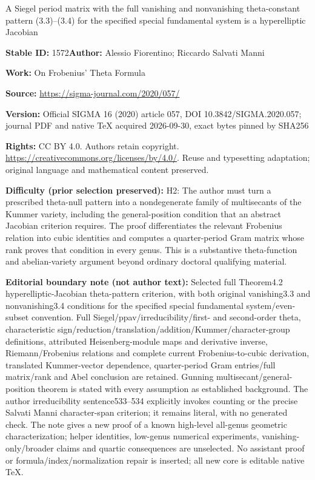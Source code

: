 \documentclass[11pt]{article}
\numberwithin{equation}{section}
\numberwithin{equation}{section}
\begin{document}
\begin{center}\Large A Siegel period matrix with the full vanishing and nonvanishing theta-constant pattern (3.3)–(3.4) for the specified special fundamental system is a hyperelliptic Jacobian\end{center}
\noindent\textbf{Stable ID:} 1572\quad\textbf{Author:} Alessio Fiorentino; Riccardo Salvati Manni\par
\noindent\textbf{Work:} On Frobenius' Theta Formula\par
\noindent\textbf{Source:} \url{https://sigma-journal.com/2020/057/}\par
\noindent\textbf{Version:} Official SIGMA 16 (2020) article 057, DOI 10.3842/SIGMA.2020.057; journal PDF and native TeX acquired 2026-09-30, exact bytes pinned by SHA256\par
\noindent\textbf{Rights:} CC BY 4.0. Authors retain copyright. \url{https://creativecommons.org/licenses/by/4.0/}. Reuse and typesetting adaptation; original language and mathematical content preserved.\par
\noindent\textbf{Difficulty (prior selection preserved):} {\CJKfont H2: The author must turn a prescribed theta-null pattern into a nondegenerate family of multisecants of the Kummer variety, including the general-position condition that an abstract Jacobian criterion requires. The proof differentiates the relevant Frobenius relation into cubic identities and computes a quarter-period Gram matrix whose rank proves that condition in every genus. This is a substantive theta-function and abelian-variety argument beyond ordinary doctoral qualifying material.}\par
\medskip\noindent\textbf{Editorial boundary note (not author text):} Selected full Theorem4.2 hyperelliptic-Jacobian theta-pattern criterion, with both original vanishing3.3 and nonvanishing3.4 conditions for the specified special fundamental system/even-subset convention. Full Siegel/ppav/irreducibility/first- and second-order theta, characteristic sign/reduction/translation/addition/Kummer/character-group definitions, attributed Heisenberg-module maps and derivative inverse, Riemann/Frobenius relations and complete current Frobenius-to-cubic derivation, translated Kummer-vector dependence, quarter-period Gram entries/full matrix/rank and Abel conclusion are retained. Gunning multisecant/general-position theorem is stated with every assumption as established background. The author irreducibility sentence533–534 explicitly invokes counting or the precise Salvati Manni character-span criterion; it remains literal, with no generated check. The note gives a new proof of a known high-level all-genus geometric characterization; helper identities, low-genus numerical experiments, vanishing-only/broader claims and quartic consequences are unselected. No assistant proof or formula/index/normalization repair is inserted; all new core is editable native TeX.\par
\end{document}
